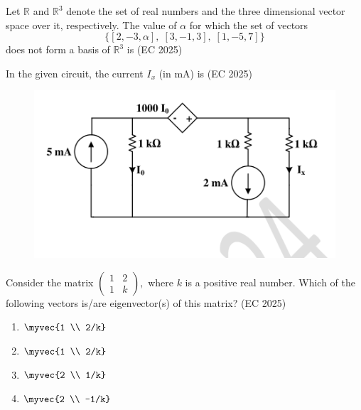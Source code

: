 \item Let $\mathbb{R}$ and $\mathbb{R}^3$ denote the set of real numbers and the three dimensional vector space over it, respectively. The value of $\alpha$ for which the set of vectors
\[
\{[2,-3,\alpha], \; [3,-1,3], \; [1,-5,7]\}
\]
does not form a basis of $\mathbb{R}^3$ is
 \hfill (EC 2025)
\item In the given circuit, the current $I_x$ (in mA) is
 \hfill (EC 2025)
\begin{figure}[H]\centering
\includegraphics[width=0.65\columnwidth]{GATE/2024/EC/figs/q31.png}
\caption{}
\label{fig:q31}
\end{figure}
\item Consider the matrix
$
\begin{pmatrix}
1 & 2 \\
1 & k
\end{pmatrix},
$
where $k$ is a positive real number. Which of the following vectors is/are eigenvector(s) of this matrix?
 \hfill (EC 2025)
\begin{multicols}{4}
\begin{enumerate}
    \item $\myvec{1 \\ 2/k}$
    \item $\myvec{1 \\ 2/k}$
    \item $\myvec{2 \\ 1/k}$
    \item $\myvec{2 \\ -1/k}$
\end{enumerate}
\end{multicols}


